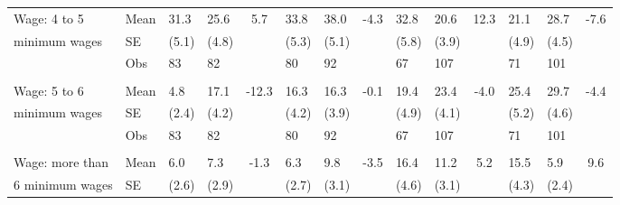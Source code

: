 \documentclass[
	article,			%
	12pt,				%
	oneside,			%
	a4paper,			%
	]{article}
\begin{document}
\begin{table}[h!]
\begin{tabular}{lp{2.335em}p{1.915em}p{2.085em}cp{1.915em}p{1.915em}cp{1.915em}p{1.915em}cp{1.915em}p{1.915em}c}
Wage: 4 to 5  &       Mean &       31.3 &       25.6 &        5.7 &       33.8 &       38.0 &       -4.3 &       32.8 &       20.6 &      12.3 &       21.1 &       28.7 &       -7.6 \\

minimum wages &         SE &      (5.1) &      (4.8) &            &      (5.3) &      (5.1) &            &      (5.8) &      (3.9) &            &      (4.9) &      (4.5) &            \\

           &        Obs &         83 &         82 &            &         80 &         92 &            &         67 &        107 &            &         71 &        101 &            \\

           &            &            &            &            &            &            &            &            &            &            &            &            &            \\

Wage: 5 to 6  &       Mean &        4.8 &       17.1 &    -12.3 &       16.3 &       16.3 &       -0.1 &       19.4 &       23.4 &       -4.0 &       25.4 &       29.7 &       -4.4 \\

minimum wages &         SE &      (2.4) &      (4.2) &            &      (4.2) &      (3.9) &            &      (4.9) &      (4.1) &            &      (5.2) &      (4.6) &            \\

           &        Obs &         83 &         82 &            &         80 &         92 &            &         67 &        107 &            &         71 &        101 &            \\

           &            &            &            &            &            &            &            &            &            &            &            &            &            \\

Wage: more than  &       Mean &        6.0 &        7.3 &       -1.3 &        6.3 &        9.8 &       -3.5 &       16.4 &       11.2 &        5.2 &       15.5 &        5.9 &      9.6 \\

6 minimum wages &         SE &      (2.6) &      (2.9) &            &      (2.7) &      (3.1) &            &      (4.6) &      (3.1) &            &      (4.3) &      (2.4) &            \\


\end{tabular}
\end{table}
\end{document}
